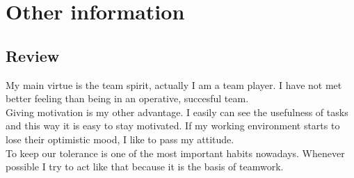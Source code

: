 \documentclass[letterpaper]{twentysecondcv}
\begin{document}

\section{Other information}

\subsection{Review}

My main virtue is the team spirit, actually I am a team player. I have not met better feeling than being in an operative, succesful team. \\Giving motivation is my other advantage. I easily can see the usefulness of tasks and this way it is easy to stay motivated. If my working environment starts to lose their optimistic mood, I like to pass my attitude. \\To keep our tolerance is one of the most important habits nowadays. Whenever possible I try to act like that because it is the basis of teamwork.
\end{document}

